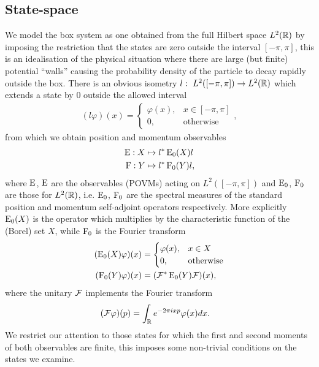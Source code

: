 \subsection{State-space }
We model the box system as one obtained from the full Hilbert space $L^2(\mathbb{R})$ by imposing the restriction that the states are zero outside the interval $[-\pi, \pi]$, this is an idealisation of the physical situation where there are large (but finite) potential ``walls'' causing the probability density of the particle to decay rapidly outside the box. There is an obvious isometry $l:~L^2([-\pi,\pi])\to L^2(\mathbb{R})$ which extends a state by $0$ outside the allowed interval
\begin{align}
  (l\varphi)(x) = \begin{cases}\varphi(x), &x\in [-\pi,\pi]\\ 0, &\text{otherwise}\end{cases},
\end{align}
from which we obtain position and momentum observables 
\begin{align}
  \operatorname{E}:X &\mapsto l^* \operatorname{E}_0(X) l\\
  \operatorname{F}:Y &\mapsto l^* \operatorname{F}_0(Y) l,
\end{align}
where $\operatorname{E}$, $\operatorname{E}$ are the observables (POVMs) acting on $L^2([-\pi,\pi])$ and $\operatorname{E}_0$, $\operatorname{F}_0$ are those for $L^2(\mathbb{R})$, i.e. $\operatorname{E}_0$, $\operatorname{F}_0$ are the spectral measures of the standard position and momentum self-adjoint operators respectively. More explicitly $\operatorname{E}_0(X)$ is the operator which multiplies by the characteristic function of the (Borel) set $X$, while $\operatorname{F}_0$ is the Fourier transform
\begin{align}
  (\operatorname{E}_0(X)\varphi)(x) &= \begin{cases}\varphi(x), &x\in X\\ 0, &\text{otherwise}\end{cases}\\
  (\operatorname{F}_0(Y)\varphi)(x) &= (\mathcal{F}^*\operatorname{E}_0(Y)\mathcal{F})(x),
\end{align}
where the unitary $\mathcal{F}$ implements the Fourier transform
\begin{align}
  (\mathcal{F}\varphi)(p) &= \int_{\mathbb{R}} e^{-2\pi i x p} \varphi(x)dx.
\end{align}
We restrict our attention to those states for which the first and second moments of both observables are finite, this imposes some non-trivial conditions on the states we examine. 

